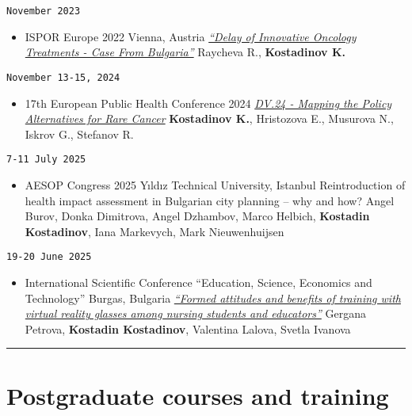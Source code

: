 \documentclass[
  12pt,
  letterpaper,
  DIV=11,
  numbers=noendperiod]{scrartcl}
\providecommand{\tightlist}{%
  \setlength{\itemsep}{0pt}\setlength{\parskip}{0pt}}\usepackage{longtable,booktabs,array}
\begin{document}
\texttt{November\ 2023}

\begin{itemize}
\tightlist
\item
  ISPOR Europe 2022 \textbar{} Vienna, Austria \textbar{}
  \emph{\href{https://www.ispor.org/heor-resources/presentations-database/presentation/euro2022-3565/120960}{``Delay
  of Innovative Oncology Treatments - Case From Bulgaria''}} \textbar{}
  Raycheva R., \textbf{Kostadinov K.}
\end{itemize}

\texttt{November\ 13-15,\ 2024}

\begin{itemize}
\tightlist
\item
  17th European Public Health Conference 2024 \textbar{}
  \emph{\href{https://ephconference.eu/app/programme/programme.php?d=displays}{DV.24
  - Mapping the Policy Alternatives for Rare Cancer}} \textbar{}
  \textbf{Kostadinov K.}, Hristozova E., Musurova N., Iskrov G.,
  Stefanov R.
\end{itemize}

\texttt{7-11\ July\ 2025}

\begin{itemize}
\tightlist
\item
  AESOP Congress 2025 \textbar{} Yıldız Technical University, Istanbul
  \textbar{} Reintroduction of health impact assessment in Bulgarian
  city planning -- why and how? \textbar{} Angel Burov, Donka Dimitrova,
  Angel Dzhambov, Marco Helbich, \textbf{Kostadin Kostadinov}, Iana
  Markevych, Mark Nieuwenhuijsen
\end{itemize}

\texttt{19-20\ June\ 2025}

\begin{itemize}
\tightlist
\item
  International Scientific Conference ``Education, Science, Economics
  and Technology'' \textbar{} Burgas, Bulgaria \textbar{}
  \emph{\href{https://www.conference-burgas.com/maevolumes/vol21_2025/book\%205_25.pdf}{``Formed
  attitudes and benefits of training with virtual reality glasses among
  nursing students and educators''}}\textbar{} Gergana Petrova,
  \textbf{Kostadin Kostadinov}, Valentina Lalova, Svetla Ivanova
\end{itemize}

\begin{center}\rule{0.5\linewidth}{0.5pt}\end{center}

\section{Postgraduate courses and
training}\label{postgraduate-courses-and-training}
\end{document}
